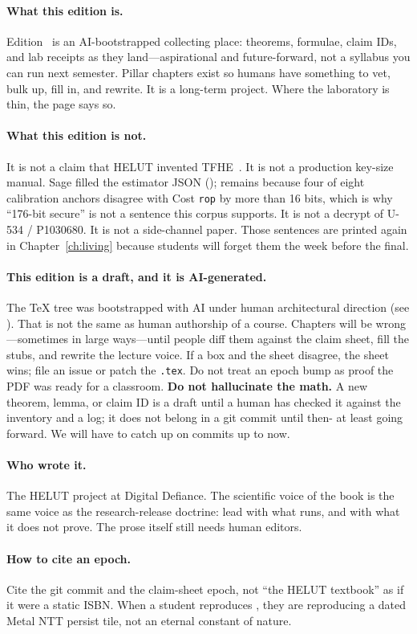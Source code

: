 \paragraph{What this edition is.}
Edition~\corpusedition{} is an AI-bootstrapped collecting place: theorems,
formulae, claim IDs, and lab receipts as they land---aspirational and
future-forward, not a syllabus you can run next semester.
Pillar chapters exist so humans have something to vet, bulk up, fill in,
and rewrite.
It is a long-term project.
Where the laboratory is thin, the page says so.

\paragraph{What this edition is not.}
It is not a claim that HELUT invented TFHE~\cite{chillotti2020tfhe,ducas2015fhew}.
It is not a production key-size manual.
Sage filled the estimator JSON ();  remains because four of eight
calibration anchors disagree with Cost \texttt{rop} by more than 16 bits, which
is why ``176-bit secure'' is not a sentence this corpus supports.
It is not a decrypt of U-534 / P1030680.
It is not a side-channel paper.
Those sentences are printed again in Chapter~\ref{ch:living} because students
will forget them the week before the final.

\paragraph{This edition is a draft, and it is AI-generated.}
The TeX tree was bootstrapped with AI under human architectural direction
(see ).
That is not the same as human authorship of a course.
Chapters will be wrong---sometimes in large ways---until people diff them
against the claim sheet, fill the stubs, and rewrite the lecture voice.
If a box and the sheet disagree, the sheet wins; file an issue or patch the
\texttt{.tex}.
Do not treat an epoch bump as proof the PDF was ready for a classroom.
\textbf{Do not hallucinate the math.}
A new theorem, lemma, or claim ID is a draft until a human has checked it
against the inventory and a log; it does not belong in a git commit until
then- at least going forward. We will have to catch up on commits up to now.

\paragraph{Who wrote it.}
The HELUT project at Digital Defiance.
The scientific voice of the book is the same voice as the research-release
doctrine: lead with what runs, and with what it does not prove.
The prose itself still needs human editors.

\paragraph{How to cite an epoch.}
Cite the git commit and the claim-sheet epoch, not ``the HELUT textbook'' as if
it were a static ISBN.
When a student reproduces , they are reproducing a dated Metal NTT
persist tile, not an eternal constant of nature.
